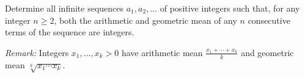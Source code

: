 Determine all infinite sequences $a_1, a_2, \dots$ of positive integers such that, for any integer $n\geq 2$,
both the arithmetic and geometric mean of any $n$ consecutive terms of the sequence are integers.

\emph{Remark:} Integers $x_1,\dots, x_k > 0$ have arithmetic mean $\frac{x_1+\cdots+x_k}{k}$ and
geometric mean $\sqrt[k]{x_1\cdots x_k}$.
